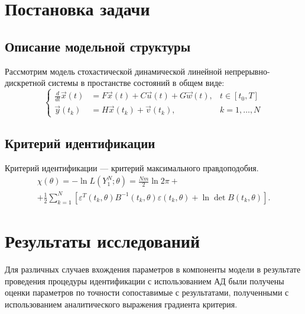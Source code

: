 \documentclass{beamer}
\begin{document}
\section{Постановка задачи}

\subsection{Описание модельной структуры}

\begin{frame}{\secname}{\subsecname}
Рассмотрим модель стохастической динамической линейной непрерывно-дискретной
системы в простанстве состояний в общем виде:
\begin{equation}
	\label{eq:initmod}
	\left\{ 
		\begin{array}{lll}
			\frac{d}{dt}\vec{x}(t) &= F \vec{x}(t) + C \vec{u}(t) + G \vec{w}(t),
				& t \in [t_0,T] \\ 
			\vec{y}(t_k)           &= H \vec{x}(t_k) + \vec{v}(t_k), 
				& k = 1,\ldots, N
		\end{array} 
	\right. 
\end{equation}

\end{frame}

\subsection{Критерий идентификации}

\newcommand{\eps}{\varepsilon}

\begin{frame}{\secname}{\subsecname}
Критерий идентификации --- критерий максимального правдоподобия.
\begin{equation}
\begin{split}
\chi(\theta) = -\ln{L(Y_1^N;\theta)} = \frac{Nm}{2} \ln{2\pi} +
\\ + \frac{1}{2} \sum\limits_{k=1}^{N} 
\left[ \eps^T(t_k, \theta) B^{-1}(t_k, \theta) \eps(t_k, \theta) + 
\ln \det B(t_k, \theta) \right].
\end{split}
\end{equation}
\end{frame}


\section{Результаты исследований}

\begin{frame}
	Для различных случаев вхождения параметров в компоненты модели в
	результате проведения процедуры идентификации с использованием АД были
	получены оценки параметров по точности сопоставимые с результатами,
	полученными с использованием аналитического выражения градиента критерия.
\end{frame}
\end{document}
